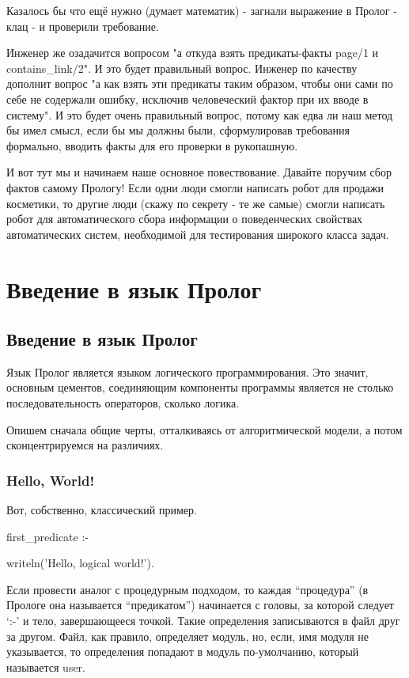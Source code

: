 \documentclass[a4paper]{book}
\begin{document}
Казалось бы что ещё нужно (думает математик) - загнали выражение
в Пролог - клац - и проверили требование.

Инженер же озадачится вопросом "а откуда взять предикаты-факты
page/1 и contains_link/2". И это будет правильный
вопрос. Инженер по качеству дополнит вопрос "а как взять эти
предикаты таким образом, чтобы они сами по себе не содержали
ошибку, исключив человеческий фактор при их вводе в систему". И
это будет очень правильный вопрос, потому как едва ли наш метод
бы имел смысл, если бы мы должны были, сформулировав требования
формально, вводить факты для его проверки в рукопашную.

И вот тут мы и начинаем наше основное повествование.  Давайте
поручим сбор фактов самому Прологу! Если одни люди смогли
написать робот для продажи косметики, то другие люди (скажу по
секрету - те же самые) смогли написать робот для автоматического
сбора информации о поведенческих свойствах автоматических систем,
необходимой для тестирования широкого класса задач.

\part{Введение в язык Пролог}
\chapter{Введение в язык Пролог}

Язык Пролог является языком логического программирования. Это
значит, основным цементов, соединяющим компоненты программы
является не столько последовательность операторов, сколько
логика. 

Опишем сначала общие черты, отталкиваясь от алгоритмической
модели, а потом сконцентрируемся на различиях.

\section{Hello, World!}

Вот, собственно, классический пример.

\begin{example}{}{}
first_predicate :-

   writeln('Hello, logical world!').
\end{example}

Если провести аналог с процедурным подходом, то каждая
``процедура'' (в Прологе она называется ``предикатом'')
начинается с головы, за которой следует `:-' и тело,
завершающееся точкой. Такие определения записываются в файл друг
за другом. Файл, как правило, определяет модуль, но, если, имя
модуля не указывается, то определения попадают в модуль
по-умолчанию, который называется user.
\end{document}
